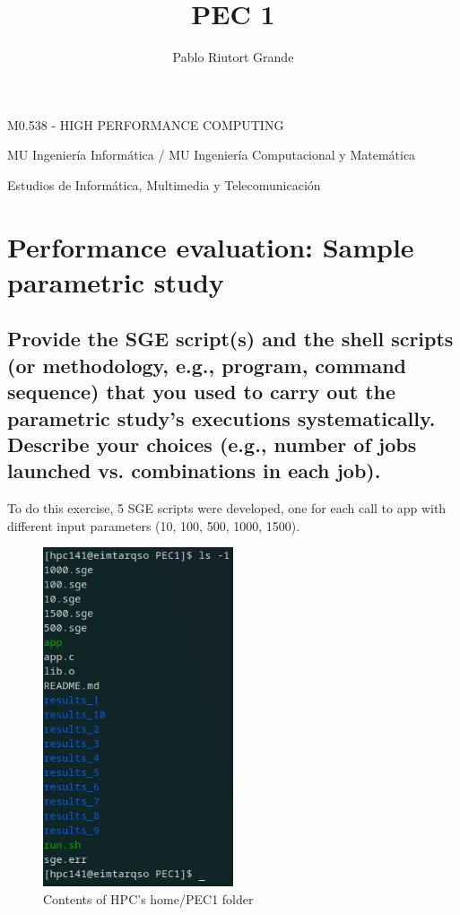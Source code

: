 \documentclass[11pt]{article}
\title{PEC 1}
\begin{document}
    \author{Pablo Riutort Grande}
    \maketitle
  
    
M0.538 - HIGH PERFORMANCE COMPUTING

MU Ingeniería Informática / MU Ingeniería Computacional y Matemática

Estudios de Informática, Multimedia y Telecomunicación

    \tableofcontents

       \newpage
\hypertarget{1}{%
\section{Performance evaluation: Sample parametric study}\label{1}}

\hypertarget{11}{%
\subsection{Provide the SGE script(s) and the shell scripts (or methodology, e.g.,
program, command sequence) that you used to carry out the parametric study's executions
systematically. Describe your choices (e.g., number of jobs launched vs. combinations in each
job).}\label{11}}

To do this exercise, 5 SGE scripts were developed, one for each call to app with different input parameters (10, 100, 500, 1000, 1500).

\begin{figure}[h]
\caption{Contents of HPC's home/PEC1 folder}
\centering
\includegraphics[width=0.5\textwidth]{ls.png}
\end{figure}
\end{document}
